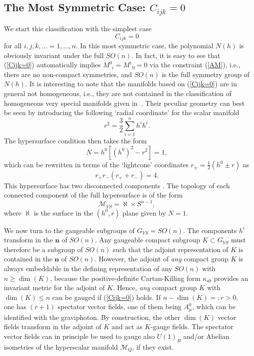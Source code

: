 \documentclass[a4paper,11pt]{article}
\newcommand{\M}{\ensuremath{\mathcal{M}}}
\begin{document}
\subsection{The Most Symmetric Case: $C_{ijk}=0$}

We start this classification with the simplest case
\begin{equation}\label{Cijk=0}
C_{ijk}=0
\end{equation}
for all $i,j,k,\ldots=1,\ldots,n$. In this most symmetric case, the
polynomial $N(h)$ is obviously invariant under the full $SO(n)$. In fact,
it is easy to see that (\ref{Cijk=0}) automatically implies
$M^{0}_{\,\,\,i}=M^{i}_{\,\,\,0}=0$ via the constraint (\ref{AM}), i.e.,
there are no non-compact symmetries, and $SO(n)$ is the full symmetry
group of $N(h)$. It is interesting to note that the manifolds based on
(\ref{Cijk=0}) are in general not homogeneous, i.e., they are not
contained in the classification of homogeneous very special manifolds
given in~\cite{dWvP2}. Their peculiar geometry can best be seen by
introducing the following `radial coordinate' for the scalar manifold 
\[ r^2 = \frac{3}{2} \sum_{i=1}^{n} h^ih^i. \] 
The hypersurface condition then takes
the form 
\[ N= h^0 [(h^0)^2 -r^2]=1, \] 
which can be rewritten in terms of the
`lightcone' coordinates $ r_{\pm}=\frac{1}{2} ( h^0\pm r) $ as 
\[ r_+ r_- (r_+ + r_- )=4. \] 
This hypersurface has two disconnected components . The
topology of each connected component of the full hypersurface is of the
form 
\[ \M_{VS}= \aleph \times S^{n-1}, \] 
where $\aleph$ is the surface in the $(h^0,r)$ plane given by $N=1$. 



We now turn to the gaugeable subgroups of $G_{VS}=SO(n)$. The
components $h^{i}$ transform in the $\mathbf{n}$ of $SO(n)$. Any gaugeable
compact subgroup $K\subset G_{VS}$ must therefore be a subgroup of $SO(n)$
such that the adjoint representation of $K$ is contained in the
$\mathbf{n}$ of $SO(n)$. However, the adjoint of \emph{any} compact group
$K$ is always embeddable in the defining representation of any $SO(n)$
with $n\geq \dim{(K)}$, because the positive-definite Cartan-Killing form
$\kappa_{ab}$ provides an invariant metric for the adjoint of $K$. Hence,
\emph{any} compact group $K$ with $\dim{(K)}\leq n$ can be gauged if
(\ref{Cijk=0})  holds. If $n-\dim{(K)}=:r>0$, one has $(r+1)$ spectator
vector fields, one of them being $A_{\mu}^{0}$, which can be identified
with the graviphoton. By construction, the other $\dim{(K)}$ vector fields
transform in the adjoint of $K$ and act as $K$-gauge fields. The spectator
vector fields can in principle be used to gauge also $U(1)_R$ and/or
Abelian isometries of the hyperscalar manifold $\M_{Q}$, if they exist. 
\end{document}
